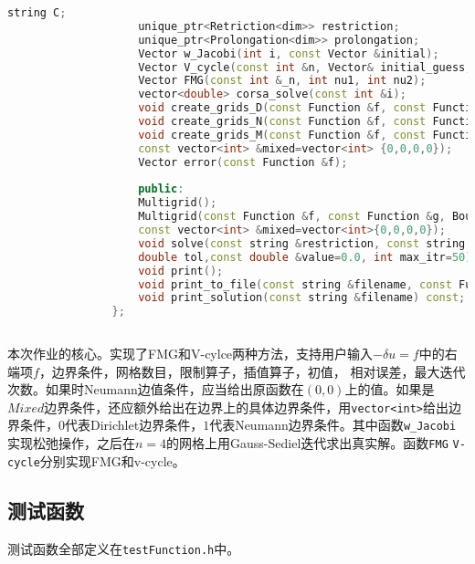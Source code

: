 \documentclass[UTF8]{ctexart}
\begin{document}
\begin{enumerate}
\begin{lstlisting}[language=C++, caption={运算符实现},
			label={lst:operators}]
					string C;
					unique_ptr<Retriction<dim>> restriction;
					unique_ptr<Prolongation<dim>> prolongation;
					Vector w_Jacobi(int i, const Vector &initial);
					Vector V_cycle(const int &n, Vector& initial_guess, int nu1, int nu2);
					Vector FMG(const int &_n, int nu1, int nu2);
					vector<double> corsa_solve(const int &i);
					void create_grids_D(const Function &f, const Function &g,const int &i);
					void create_grids_N(const Function &f, const Function &g,const int &i);
					void create_grids_M(const Function &f, const Function &g,const int &i, 
					const vector<int> &mixed=vector<int> {0,0,0,0});
					Vector error(const Function &f);
					
					public:
					Multigrid();
					Multigrid(const Function &f, const Function &g, BoundaryCondition bc, const int &i,
					const vector<int> &mixed=vector<int>{0,0,0,0});
					void solve(const string &restriction, const string &prolongation, const string &cycle, Vector& initial_guess, int nu1, int nu2,
					double tol,const double &value=0.0, int max_itr=50);
					void print();
					void print_to_file(const string &filename, const Function &f);
					void print_solution(const string &filename) const;
				};
			
		\end{lstlisting}
		本次作业的核心。实现了FMG和V-cylce两种方法，支持用户输入$-\delta u=f$中的右端项$f$，边界条件，网格数目，限制算子，插值算子，初值， 相对误差，最大迭代次数。如果时Neumann边值条件，应当给出原函数在$(0,0)$上的值。如果是$Mixed$边界条件，还应额外给出在边界上的具体边界条件，用\texttt{vector<int>}给出边界条件，$0$代表Dirichlet边界条件，$1$代表Neumann边界条件。其中函数\texttt{w\_Jacobi}实现松弛操作，之后在$n=4$的网格上用Gauss-Sediel迭代求出真实解。函数\texttt{FMG} \texttt{V-cycle}分别实现FMG和v-cycle。
	\end{enumerate}
	\subsection{测试函数}
	测试函数全部定义在\texttt{testFunction.h}中。
\end{document}
